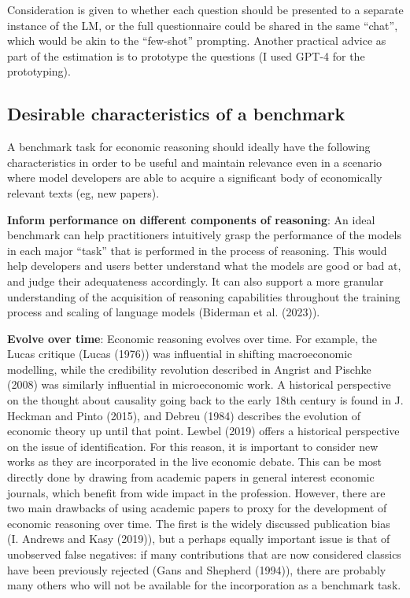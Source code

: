 \documentclass[
]{article}
\begin{document}
Consideration is given to whether each question should be presented to a
separate instance of the LM, or the full questionnaire could be shared
in the same ``chat'', which would be akin to the ``few-shot'' prompting.
Another practical advice as part of the estimation is to prototype the
questions (I used GPT-4 for the prototyping).

\subsection{Desirable characteristics of a
benchmark}\label{desirable-characteristics-of-a-benchmark}

A benchmark task for economic reasoning should ideally have the
following characteristics in order to be useful and maintain relevance
even in a scenario where model developers are able to acquire a
significant body of economically relevant texts (eg, new papers).

\textbf{Inform performance on different components of reasoning}: An
ideal benchmark can help practitioners intuitively grasp the performance
of the models in each major ``task'' that is performed in the process of
reasoning. This would help developers and users better understand what
the models are good or bad at, and judge their adequateness accordingly.
It can also support a more granular understanding of the acquisition of
reasoning capabilities throughout the training process and scaling of
language models (Biderman et al. (2023)).

\textbf{Evolve over time}: Economic reasoning evolves over time. For
example, the Lucas critique (Lucas (1976)) was influential in shifting
macroeconomic modelling, while the credibility revolution described in
Angrist and Pischke (2008) was similarly influential in microeconomic
work. A historical perspective on the thought about causality going back
to the early 18th century is found in J. Heckman and Pinto (2015), and
Debreu (1984) describes the evolution of economic theory up until that
point. Lewbel (2019) offers a historical perspective on the issue of
identification. For this reason, it is important to consider new works
as they are incorporated in the live economic debate. This can be most
directly done by drawing from academic papers in general interest
economic journals, which benefit from wide impact in the profession.
However, there are two main drawbacks of using academic papers to proxy
for the development of economic reasoning over time. The first is the
widely discussed publication bias (I. Andrews and Kasy (2019)), but a
perhaps equally important issue is that of unobserved false negatives:
if many contributions that are now considered classics have been
previously rejected (Gans and Shepherd (1994)), there are probably many
others who will not be available for the incorporation as a benchmark
task.
\end{document}
